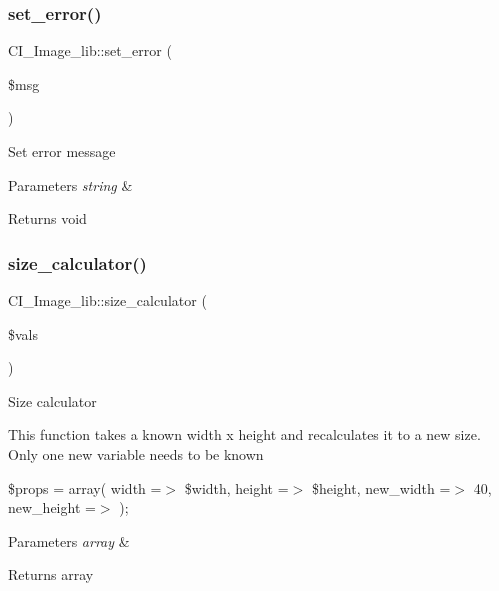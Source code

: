 \subsubsection{\texorpdfstring{set\+\_\+error()}{set\_error()}}
{\footnotesize\ttfamily C\+I\+\_\+\+Image\+\_\+lib\+::set\+\_\+error (\begin{DoxyParamCaption}\item[{}]{\$msg }\end{DoxyParamCaption})}

Set error message


\begin{DoxyParams}{Parameters}
{\em string} & \\
\hline
\end{DoxyParams}
\begin{DoxyReturn}{Returns}
void 
\end{DoxyReturn}
\mbox{\label{class_c_i___image__lib_ac30ca3c1ab4745b7bd1e0537fc8c1c8c}} 
\subsubsection{\texorpdfstring{size\+\_\+calculator()}{size\_calculator()}}
{\footnotesize\ttfamily C\+I\+\_\+\+Image\+\_\+lib\+::size\+\_\+calculator (\begin{DoxyParamCaption}\item[{}]{\$vals }\end{DoxyParamCaption})}

Size calculator

This function takes a known width x height and recalculates it to a new size. Only one new variable needs to be known

\$props = array( \textquotesingle{}width\textquotesingle{} =$>$ \$width, \textquotesingle{}height\textquotesingle{} =$>$ \$height, \textquotesingle{}new\+\_\+width\textquotesingle{} =$>$ 40, \textquotesingle{}new\+\_\+height\textquotesingle{} =$>$ \textquotesingle{}\textquotesingle{} );


\begin{DoxyParams}{Parameters}
{\em array} & \\
\hline
\end{DoxyParams}
\begin{DoxyReturn}{Returns}
array 
\end{DoxyReturn}
\mbox{\label{class_c_i___image__lib_a0054d8ead550b37576d1a612190c6ef3}} 
